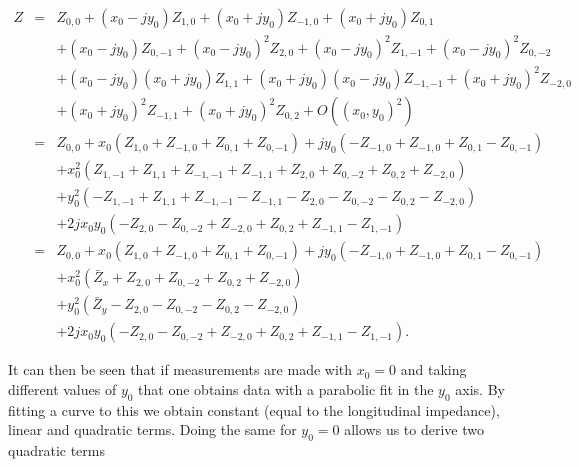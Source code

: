 \documentclass[review, number, sort&compress]{elsarticle}
\begin{document}
\begin{align}
Z &=&Z_{0,0} +  \left( x_{0} - jy_{0} \right) Z_{1,0} + \left( x_{0} + jy_{0} \right)  Z_{-1,0} + \left( x_{0} + jy_{0} \right) Z_{0,1} \nonumber \\
   &   &+ \left( x_{0} - jy_{0} \right) Z_{0,-1} + \left( x_{0} - jy_{0} \right)^{2} Z_{2,0} + \left( x_{0} - jy_{0} \right)^{2} Z_{1,-1} + \left( x_{0} - jy_{0} \right) ^{2}Z_{0,-2} \nonumber \\
   &   &+\left( x_{0} - jy_{0} \right) \left( x_{0} + jy_{0} \right) Z_{1,1} + \left( x_{0} + jy_{0} \right)\left( x_{0} - jy_{0} \right) Z_{-1,-1} + \left( x_{0} + jy_{0} \right)^{2}Z_{-2,0} \nonumber \\
   &   &+\left( x_{0} + jy_{0} \right)^{2} Z_{-1,1} + \left( x_{0} + jy_{0} \right)^{2}Z_{0,2} + O\left( \left(x_{0},y_{0} \right)^{2} \right) \nonumber \\
   &=&Z_{0,0} + x_{0}\left( Z_{1,0}+Z_{-1,0}+Z_{0,1}+Z_{0,-1} \right) +jy_{0} \left( -Z_{-1,0} + Z_{-1,0} + Z_{0,1} - Z_{0,-1} \right) \nonumber \\
   &   &+x_{0}^{2} \left(  Z_{1,-1}+Z_{1,1}+Z_{-1,-1}+Z_{-1,1} + Z_{2,0} + Z_{0,-2} + Z_{0,2} + Z_{-2,0} \right) \nonumber \\
   &   &+y_{0}^{2} \left(  -Z_{1,-1}+Z_{1,1}+Z_{-1,-1}-Z_{-1,1} - Z_{2,0} - Z_{0,-2} - Z_{0,2} - Z_{-2,0} \right) \nonumber \\
   &   &+2jx_{0}y_{0}\left( -Z_{2,0} - Z_{0,-2} + Z_{-2,0} + Z_{0,2} + Z_{-1,1} - Z_{1,-1} \right) \nonumber \\
   &=&Z_{0,0} + x_{0}\left( Z_{1,0}+Z_{-1,0}+Z_{0,1}+Z_{0,-1} \right) +jy_{0} \left( -Z_{-1,0} + Z_{-1,0} + Z_{0,1} - Z_{0,-1} \right) \nonumber \\
   &   &+x_{0}^{2} \left( \bar{Z}_{x} + Z_{2,0} + Z_{0,-2} + Z_{0,2} + Z_{-2,0} \right) \nonumber \\
   &   &+y_{0}^{2} \left( \bar{Z}_{y} - Z_{2,0} - Z_{0,-2} - Z_{0,2} - Z_{-2,0} \right) \nonumber \\
   &   &+2jx_{0}y_{0}\left( -Z_{2,0} - Z_{0,-2} + Z_{-2,0} + Z_{0,2} + Z_{-1,1} - Z_{1,-1} \right).
\label{eqn:gen_single_wire}
\end{align}

It can then be seen that if measurements are made with $x_{0} = 0$ and taking different values of $y_{0}$ that one obtains data with a parabolic fit in the $y_{0}$ axis. By fitting a curve to this we obtain constant (equal to the longitudinal impedance), linear and quadratic terms. Doing the same for $y_{0}=0$ allows us to derive two quadratic terms
\end{document}
